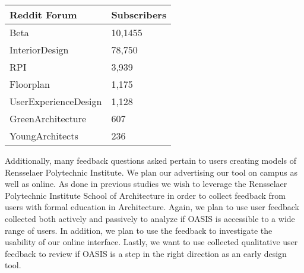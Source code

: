 	\begin{table}[h!]
	\centering
	    \begin{tabular}{ | l | l | }
	        \hline
		    Reddit Forum             & Subscribers  \\ \hline
		    Beta 					& 10,1455       \\ \hline
		    InteriorDesign 			& 78,750        \\ \hline
		    RPI 			        & 3,939         \\ \hline
		    Floorplan    			& 1,175         \\ \hline
		    UserExperienceDesign    & 1,128         \\ \hline
		    GreenArchitecture 		& 607          \\ \hline
		    YoungArchitects 		& 236          \\ \hline
	    \end{tabular}
	\end{table}

	Additionally, many feedback questions asked pertain to users creating models of Rensselaer Polytechnic Institute.
	We plan our advertising our tool on campus as well as online.
	As done in previous studies we wish to leverage the Rensselaer Polytechnic Institute School of Architecture in order to collect feedback from users with formal education in Architecture.
	Again, we plan to use user feedback collected both actively and passively to analyze if OASIS is accessible to a wide range of users.
	In addition, we plan to use the feedback to investigate the usability of our online interface.
	Lastly, we want to use collected qualitative user feedback to review if OASIS is a step in the right direction as an early design tool.


